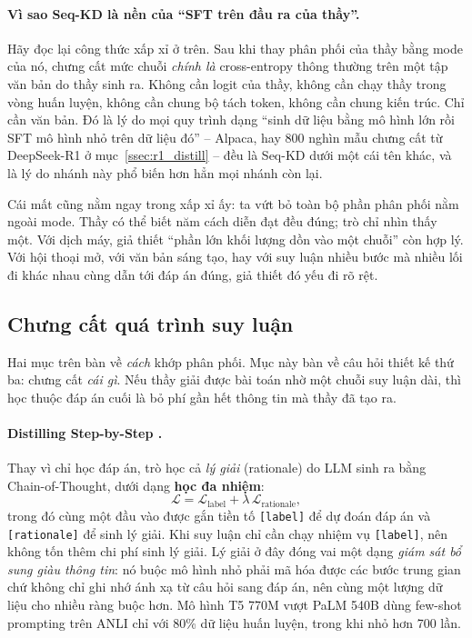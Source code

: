 \paragraph{Vì sao Seq-KD là nền của ``SFT trên đầu ra của thầy''.} Hãy đọc lại công thức xấp xỉ ở trên. Sau khi thay phân phối của thầy bằng mode của nó, chưng cất mức chuỗi \emph{chính là} cross-entropy thông thường trên một tập văn bản do thầy sinh ra. Không cần logit của thầy, không cần chạy thầy trong vòng huấn luyện, không cần chung bộ tách token, không cần chung kiến trúc. Chỉ cần văn bản. Đó là lý do mọi quy trình dạng ``sinh dữ liệu bằng mô hình lớn rồi SFT mô hình nhỏ trên dữ liệu đó'' -- Alpaca, hay 800 nghìn mẫu chưng cất từ DeepSeek-R1 ở mục~\ref{ssec:r1_distill} -- đều là Seq-KD dưới một cái tên khác, và là lý do nhánh này phổ biến hơn hẳn mọi nhánh còn lại.

Cái mất cũng nằm ngay trong xấp xỉ ấy: ta vứt bỏ toàn bộ phần phân phối nằm ngoài mode. Thầy có thể biết năm cách diễn đạt đều đúng; trò chỉ nhìn thấy một. Với dịch máy, giả thiết ``phần lớn khối lượng dồn vào một chuỗi'' còn hợp lý. Với hội thoại mở, với văn bản sáng tạo, hay với suy luận nhiều bước mà nhiều lối đi khác nhau cùng dẫn tới đáp án đúng, giả thiết đó yếu đi rõ rệt.

\subsection{Chưng cất quá trình suy luận}
\label{ssec:rationale_distillation}

Hai mục trên bàn về \emph{cách} khớp phân phối. Mục này bàn về câu hỏi thiết kế thứ ba: chưng cất \emph{cái gì}. Nếu thầy giải được bài toán nhờ một chuỗi suy luận dài, thì học thuộc đáp án cuối là bỏ phí gần hết thông tin mà thầy đã tạo ra.

\paragraph{Distilling Step-by-Step \cite{hsieh2023distilling}.} Thay vì chỉ học đáp án, trò học cả \emph{lý giải} (rationale) do LLM sinh ra bằng Chain-of-Thought, dưới dạng \textbf{học đa nhiệm}:
\[
\mathcal{L} = \mathcal{L}_{\text{label}} + \lambda\, \mathcal{L}_{\text{rationale}},
\]
trong đó cùng một đầu vào được gắn tiền tố \texttt{[label]} để dự đoán đáp án và \texttt{[rationale]} để sinh lý giải. Khi suy luận chỉ cần chạy nhiệm vụ \texttt{[label]}, nên không tốn thêm chi phí sinh lý giải. Lý giải ở đây đóng vai một dạng \emph{giám sát bổ sung giàu thông tin}: nó buộc mô hình nhỏ phải mã hóa được các bước trung gian chứ không chỉ ghi nhớ ánh xạ từ câu hỏi sang đáp án, nên cùng một lượng dữ liệu cho nhiều ràng buộc hơn. Mô hình T5 770M vượt PaLM 540B dùng few-shot prompting trên ANLI chỉ với 80\% dữ liệu huấn luyện, trong khi nhỏ hơn 700 lần.

